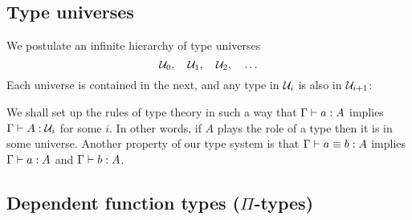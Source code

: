 \subsection{Type universes}

%

We postulate an infinite hierarchy of type universes
%
\begin{equation*}
  \mathcal{U}_0, \quad \mathcal{U}_1, \quad  \mathcal{U}_2, \quad \ldots
\end{equation*}
%
Each universe is contained in the next, and any type in $\mathcal{U}_i$ is also in $\mathcal{U}_{i+1}$:
%
%
We shall set up the rules of type theory in such a way that $\Gamma \vdash a : A$
implies $\Gamma \vdash A : \mathcal{U}_i$ for some $i$. In other words, if $A$ plays the role of a type then it is in some universe. Another property of our type system is that $\Gamma \vdash a \equiv b : A$
implies $\Gamma \vdash a : A$ and $\Gamma \vdash b : A$.

\subsection{Dependent function types (\texorpdfstring{$\Pi$}{Π}-types)}
\label{sec:more-formal-pi}

%
%

